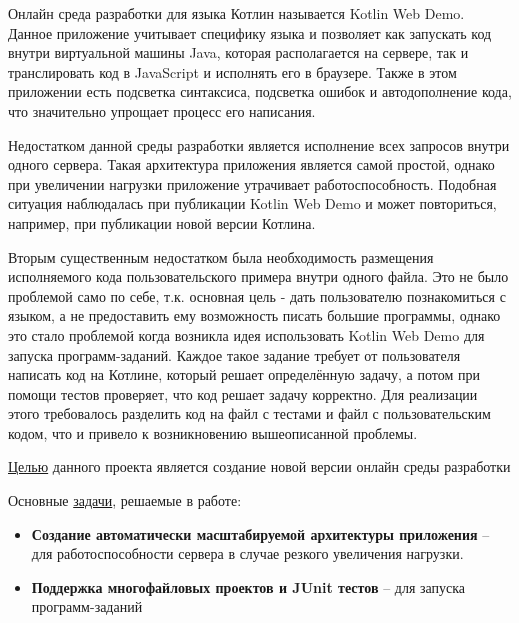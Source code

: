 	Онлайн среда разработки для языка Котлин называется Kotlin Web Demo. Данное приложение учитывает специфику  языка и позволяет как запускать код внутри виртуальной машины Java, которая располагается на сервере, так и транслировать код в JavaScript и исполнять его в браузере. Также в этом приложении есть подсветка синтаксиса, подсветка ошибок и автодополнение кода, что значительно упрощает процесс его написания.
	

	Недостатком данной среды разработки является исполнение всех запросов внутри одного сервера. Такая архитектура приложения является самой простой, однако при увеличении нагрузки приложение утрачивает работоспособность. Подобная ситуация наблюдалась при публикации Kotlin Web Demo и может повториться, например, при публикации новой версии Котлина.
	
	
	Вторым существенным недостатком была необходимость размещения  исполняемого кода  пользовательского примера внутри одного файла. Это не было проблемой само по себе, т.к. основная цель - дать пользователю познакомиться с языком, а не предоставить ему возможность писать большие программы, однако это стало проблемой когда возникла идея использовать Kotlin Web Demo для запуска программ-заданий. Каждое такое задание требует от пользователя написать код на Котлине, который решает определённую задачу, а потом при помощи тестов проверяет, что код решает задачу корректно. Для реализации этого требовалось разделить код на файл с тестами и файл с пользовательским кодом, что и привело к возникновению вышеописанной проблемы.
	
	
	\underline{Целью} данного проекта является создание новой версии онлайн среды разработки
	
	Основные \underline{задачи}, решаемые в работе:
	\begin{itemize}
		\item { \bf Создание автоматически масштабируемой архитектуры приложения} -- для работоспособности сервера в случае резкого увеличения нагрузки.
		\item { \bf Поддержка многофайловых проектов и JUnit тестов} -- для запуска программ-заданий
	\end{itemize}
		



